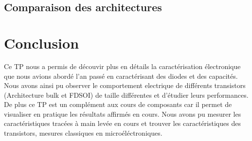 \documentclass[a4paper,11pt]{report}
\begin{document}
\section{Comparaison des architectures}

\chapter*{Conclusion}

Ce TP nous a permis de découvir plus en détails la caractérisation électronique que nous avions abordé l'an passé en caractérisant des diodes et des capacités. Nous avons ainsi pu observer le comportement electrique de différents transistors (Architecture bulk et FDSOI) de taille différentes et d'étudier leurs performances. De plus ce TP est un complément aux cours de composants car il permet de visualiser en pratique les résultats affirmés en cours. Nous avons pu mesurer les caractéristiques tracées à main levée en cours et trouver les caractéristiques des transistors, mesures classiques en microéléctroniques.
\end{document}

